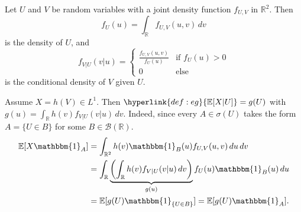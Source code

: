 \documentclass{article}
\newcommand{\1}[1]{\mathbbm{1}_{#1}}
\newcommand{\E}{\mathbb{E}}
\begin{document}
\begin{eg}
  \newlec
  Let $U$ and $V$ be random variables with a joint density function $f_{U,V}$ in $\mathbb{R}^2$. Then
  \begin{equation*}
    f_U(u) = \int_\mathbb{R} f_{U,V}(u,v) \,dv
  \end{equation*}
  is the density of $U$, and
  \begin{equation*}
    f_{V|U} (v | u) =
    \begin{cases}
      \frac{f_{U,V}(u,v)}{f_U(u)} & \text{if } f_U(u) > 0 \\
      0 & \text{else}
    \end{cases}
  \end{equation*}
  is the conditional density of $V$ given $U$.

  Assume $X = h(V) \in L^1$. Then $\hyperlink{def:eg}{\E[X|U]} = g(U)$ with $g(u) = \int_\mathbb{R} h(v) f_{V|U} (v|u)  \,dv$.
  Indeed, since every $A \in \sigma(U)$ takes the form $A = \{U \in B\}$ for some $B \in \mathcal{B}(\mathbb{R})$.
  \begin{align*}
    \E[X \1A] &= \int_{\mathbb{R}^2} h(v) \1B(u) f_{U,V} (u,v) \, du \, dv \\
              &= \int_\mathbb{R} \underbrace{\left(\int_\mathbb{R} h(v) f_{V|U}(v|u) \,dv\right)}_{g(u)} f_U(u) \1B(u)\,du \\
              &= \E[g(U) \1{\{U \in B\}}] = \E[g(U) \1A].
  \end{align*}
\end{eg}
\end{document}
